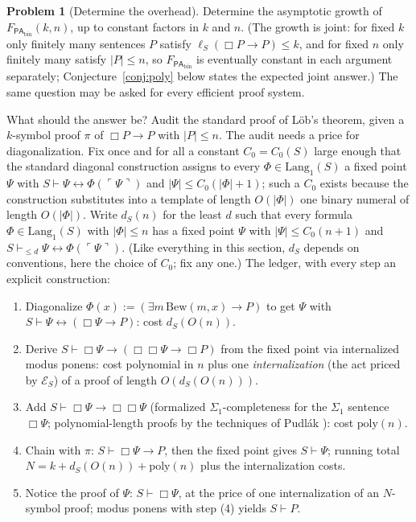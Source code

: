 \documentclass[11pt]{amsart}
\theoremstyle{plain}
\theoremstyle{definition}
\newtheorem{problem}[theorem]{Problem}
\newcommand{\PAbin}{\mathsf{PA}_{\mathrm{bin}}}
\newcommand{\Lang}{\mathrm{Lang}}
\newcommand{\gn}[1]{\ulcorner #1 \urcorner}
\begin{document}
\begin{problem}[Determine the overhead]
\label{prob:determineF}
Determine the asymptotic growth of $F_{\PAbin}(k,n)$, up to constant factors in $k$ and $n$. (The growth is joint: for fixed $k$ only finitely many sentences $P$ satisfy $\ell_S(\Box P \to P) \le k$, and for fixed $n$ only finitely many satisfy $|P| \le n$, so $F_{\PAbin}$ is eventually constant in each argument separately; Conjecture~\ref{conj:poly} below states the expected joint answer.) The same question may be asked for every efficient proof system.
\end{problem}

What should the answer be? Audit the standard proof of L\"ob's theorem, given a $k$-symbol proof $\pi$ of $\Box P \to P$ with $|P| \le n$. The audit needs a price for diagonalization. Fix once and for all a constant $C_0 = C_0(S)$ large enough that the standard diagonal construction assigns to every $\Phi \in \Lang_1(S)$ a fixed point $\Psi$ with $S \vdash \Psi \leftrightarrow \Phi(\gn{\Psi})$ and $|\Psi| \le C_0(|\Phi|+1)$; such a $C_0$ exists because the construction substitutes into a template of length $O(|\Phi|)$ one binary numeral of length $O(|\Phi|)$. Write $d_S(n)$ for the least $d$ such that every formula $\Phi \in \Lang_1(S)$ with $|\Phi| \le n$ has a fixed point $\Psi$ with $|\Psi| \le C_0(n+1)$ and $S \vdash_{\le d} \Psi \leftrightarrow \Phi(\gn{\Psi})$. (Like everything in this section, $d_S$ depends on conventions, here the choice of $C_0$; fix any one.) The ledger, with every step an explicit construction:
\begin{enumerate}
\item Diagonalize $\Phi(x) := (\exists m\,\mathrm{Bew}(m,x) \to P)$ to get $\Psi$ with $S \vdash \Psi \leftrightarrow (\Box\Psi \to P)$: cost $d_S(O(n))$.
\item Derive $S \vdash \Box\Psi \to (\Box\Box\Psi \to \Box P)$ from the fixed point via internalized modus ponens: cost polynomial in $n$ plus one \emph{internalization} (the act priced by $\mathcal{E}_S$) of a proof of length $O(d_S(O(n)))$.
\item Add $S \vdash \Box\Psi \to \Box\Box\Psi$ (formalized $\Sigma_1$-completeness for the $\Sigma_1$ sentence $\Box\Psi$; polynomial-length proofs by the techniques of Pudl\'ak \cite{pudlak1998}): cost $\mathrm{poly}(n)$.
\item Chain with $\pi$: $S \vdash \Box\Psi \to P$, then the fixed point gives $S \vdash \Psi$; running total $N = k + d_S(O(n)) + \mathrm{poly}(n)$ plus the internalization costs.
\item Notice the proof of $\Psi$: $S \vdash \Box\Psi$, at the price of one internalization of an $N$-symbol proof; modus ponens with step (4) yields $S \vdash P$.
\end{enumerate}
\end{document}
